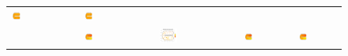 \documentclass[a4paper,11pt,twoside,openright]{book}							%
\begin{document}
\begin{landscape}
\begin{figure}
\begin{tabular}{lccccc}
\includegraphics[trim=0cm 0cm 0cm 1.8cm,clip=true,width=0.19\textwidth,valign=t]{Immagini/simulazioni_covar/SOAPtempo3.png}&
\includegraphics[trim=0cm 0cm 0cm 1.8cm,clip=true,width=0.19\textwidth,valign=t]{Immagini/simulazioni_covar/STSRtempo3.png}\\
\parbox[t]{2mm}{}&
\includegraphics[trim=0cm 0cm 0cm 1.8cm,clip=true,width=0.19\textwidth,valign=t]{Immagini/simulazioni_covar/REALEtempo4.png}&
\includegraphics[trim=0.8cm 0.8cm 2.5cm 1.2cm,clip=true,width=0.19\textwidth,valign=t]{Immagini/simulazioni_covar/Dati_tempo4.png}&
\includegraphics[trim=0cm 0cm 0cm 1.8cm,clip=true,width=0.19\textwidth,valign=t]{Immagini/simulazioni_covar/TPStempo4.png}&
\includegraphics[trim=0cm 0cm 0cm 1.8cm,clip=true,width=0.19\textwidth,valign=t]{Immagini/simulazioni_covar/SOAPtempo4.png}&

\end{tabular}
\end{figure}
\end{landscape}
\end{document}

